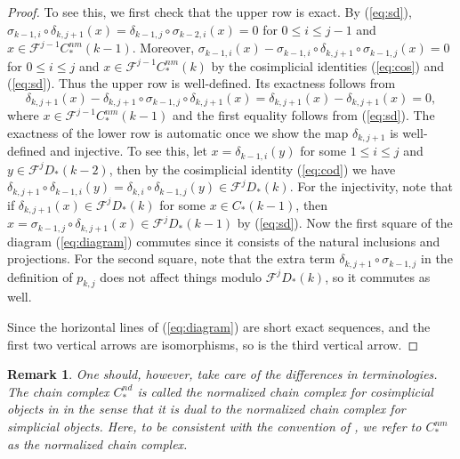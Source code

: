 \documentclass[a4paper]{article}
\newtheorem{remark}[theorem]{Remark}
\numberwithin{equation}{section}
\begin{document}
\begin{proof}
To see this, we first check that the upper row is exact. By (\ref{eq:sd}), $\sigma_{k-1,i}\circ\delta_{k,j+1}(x)=\delta_{k-1,j}\circ\sigma_{k-2,i}(x)=0$ for $0\leq i\leq j-1$ and $x\in\mathscr{F}^{j-1}C_\ast^\mathit{nm}(k-1)$. Moreover, $\sigma_{k-1,i}(x)-\sigma_{k-1,i}\circ\delta_{k,j+1}\circ\sigma_{k-1,j}(x)=0$ for $0\leq i\leq j$ and $x\in\mathscr{F}^{j-1}C_\ast^\mathit{nm}(k)$ by the cosimplicial identities (\ref{eq:cos}) and (\ref{eq:sd}). Thus the upper row is well-defined. Its exactness follows from
\begin{equation}
\delta_{k,j+1}(x)-\delta_{k,j+1}\circ\sigma_{k-1,j}\circ\delta_{k,j+1}(x)=\delta_{k,j+1}(x)-\delta_{k,j+1}(x)=0,
\end{equation}
where $x\in\mathscr{F}^{j-1}C_\ast^\mathit{nm}(k-1)$ and the first equality follows from (\ref{eq:sd}). The exactness of the lower row is automatic once we show the map $\delta_{k,j+1}$ is well-defined and injective. To see this, let $x=\delta_{k-1,i}(y)$ for some $1\leq i\leq j$ and $y\in\mathscr{F}^{j}D_\ast(k-2)$, then by the cosimplicial identity (\ref{eq:cod}) we have $\delta_{k,j+1}\circ\delta_{k-1,i}(y)=\delta_{k,i}\circ\delta_{k-1,j}(y)\in\mathscr{F}^jD_\ast(k)$. For the injectivity, note that if $\delta_{k,j+1}(x)\in\mathscr{F}^jD_\ast(k)$ for some $x\in C_\ast(k-1)$, then $x=\sigma_{k-1,j}\circ\delta_{k,j+1}(x)\in\mathscr{F}^{j}D_\ast(k-1)$ by (\ref{eq:sd}). Now the first square of the diagram (\ref{eq:diagram}) commutes since it consists of the natural inclusions and projections. For the second square, note that the extra term $\delta_{k,j+1}\circ\sigma_{k-1,j}$ in the definition of $p_{k,j}$ does not affect things modulo $\mathscr{F}^jD_\ast(k)$, so it commutes as well.

Since the horizontal lines of (\ref{eq:diagram}) are short exact sequences, and the first two vertical arrows are isomorphisms, so is the third vertical arrow.
\end{proof}

\begin{remark}
One should, however, take care of the differences in terminologies. The chain complex $C_\ast^\mathit{nd}$ is called the normalized chain complex for cosimplicial objects in \cite{stack} in the sense that it is dual to the normalized chain complex for simplicial objects. Here, to be consistent with the convention of \cite{ki1}, we refer to $C_\ast^\mathit{nm}$ as the normalized chain complex.
\end{remark}
\end{document}
